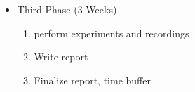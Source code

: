 \documentclass[a4paper, twocolumn]{article}
\begin{document}
\begin{itemize}
    \item[] Third Phase (3 Weeks)
    \begin{enumerate}
        \setcounter{enumi}{\value{remember}}
        \item perform experiments and recordings
        \item Write report
        \item Finalize report, time buffer
    \end{enumerate}
\end{itemize}	




\end{document}
